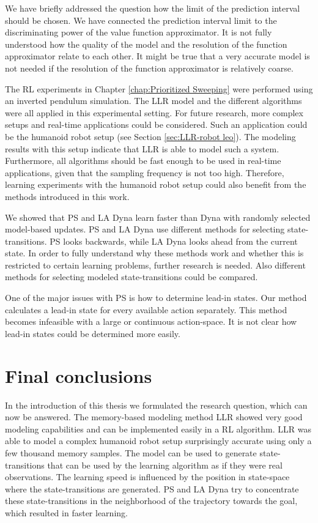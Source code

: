 We have briefly addressed the question how the limit of the prediction interval should be chosen. We have connected the prediction interval limit to the discriminating power of the value function approximator. It is not fully understood how the quality of the model and the resolution of the function approximator relate to each other. It might be true that a very accurate model is not needed if the resolution of the function approximator is relatively coarse.

The \ac{RL} experiments in Chapter \ref{chap:Prioritized Sweeping} were performed using an inverted pendulum simulation. The \ac{LLR} model and the different algorithms were all applied in this experimental setting. For future research, more complex setups and real-time applications could be considered. Such an application could be the humanoid robot setup (see Section \ref{sec:LLR-robot leo}). The modeling results with this setup indicate that \ac{LLR} is able to model such a system. Furthermore, all algorithms should be fast enough to be used in real-time applications, given that the sampling frequency is not too high. Therefore, learning experiments with the humanoid robot setup could also benefit from the methods introduced in this work.

We showed that \ac{PS} and \ac{LA Dyna} learn faster than Dyna with randomly selected model-based updates. \ac{PS} and \ac{LA Dyna} use different methods for selecting state-transitions. \ac{PS} looks backwards, while \ac{LA Dyna} looks ahead from the current state. In order to fully understand why these methods work and whether this is restricted to certain learning problems, further research is needed. Also different methods for selecting modeled state-transitions could be compared.

One of the major issues with \ac{PS} is how to determine lead-in states. Our method calculates a lead-in state for every available action separately. This method becomes infeasible with a large or continuous action-space. It is not clear how lead-in states could be determined more easily.

\section{Final conclusions}

In the introduction of this thesis we formulated the research question, which can now be answered. The memory-based modeling method \ac{LLR} showed very good modeling capabilities and can be implemented easily in a \ac{RL} algorithm. \ac{LLR} was able to model a complex humanoid robot setup surprisingly accurate using only a few thousand memory samples. The model can be used to generate state-transitions that can be used by the learning algorithm as if they were real observations. The learning speed is influenced by the position in state-space where the state-transitions are generated. \ac{PS} and \ac{LA Dyna} try to concentrate these state-transitions in the neighborhood of the trajectory towards the goal, which resulted in faster learning. 

